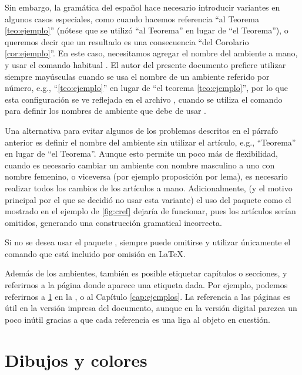 Sin embargo, la gram\'atica del espa\~nol hace necesario introducir variantes en
algunos casos especiales, como cuando hacemos referencia ``al Teorema
\ref{teo:ejemplo}'' (n\'otese que se utiliz\'o ``al Teorema'' en lugar de ``el
Teorema''), o queremos decir que un resultado es una consecuencia ``del
Corolario \ref{cor:ejemplo}''.   En este caso, necesitamos agregar el nombre del
ambiente a mano, y usar el comando habitual .   El
autor del presente documento prefiere utilizar siempre may\'usculas cuando se
usa el nombre de un ambiente referido por n\'umero, e.g., ``\cref{teo:ejemplo}''
en lugar de ``el teorema \ref{teo:ejemplo}'', por lo que esta configuraci\'on se
ve reflejada en el archivo , cuando se utiliza el comando
 para definir los nombres de ambiente que debe de
usar .

Una alternativa para evitar algunos de los problemas descritos en el p\'arrafo
anterior es definir el nombre del ambiente sin utilizar el art\'iculo, e.g.,
``Teorema'' en lugar de ``el Teorema''.   Aunque esto permite un poco m\'as de
flexibilidad, cuando es necesario cambiar un ambiente con nombre masculino a uno
con nombre femenino, o viceversa (por ejemplo proposici\'on por lema), es
necesario realizar todos los cambios de los art\'iculos a mano.  Adicionalmente,
(y el motivo principal por el que se decidi\'o no usar esta variante) el uso del
paquete como el mostrado en el ejemplo de \cref{fig:cref} dejar\'ia de
funcionar, pues los art\'iculos ser\'ian omitidos, generando una construcci\'on
gramatical incorrecta.

Si no se desea usar el paquete , siempre puede omitirse y utilizar
\'unicamente el comando  que est\'a incluido por
omisi\'on en \LaTeX.

Adem\'as de los ambientes, tambi\'en es posible etiquetar cap\'itulos o
secciones, y referirnos a la p\'agina donde aparece una etiqueta dada.   Por
ejemplo, podemos referirnos a \cref{sec:dibujos} en la , o
al Cap\'itulo \ref{cap:ejemplos}.   La referencia a las p\'aginas es \'util en
la versi\'on impresa del documento, aunque en la versi\'on digital parezca un
poco in\'util gracias a que cada referencia es una liga al objeto en cuesti\'on.



\section{Dibujos y colores}
\label{sec:dibujos}

